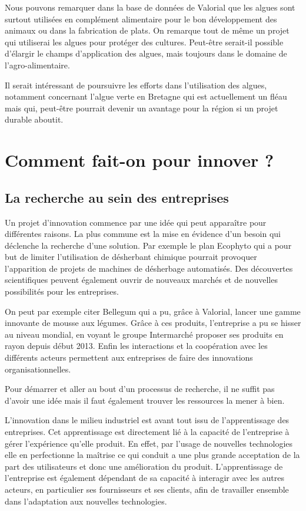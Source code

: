 \documentclass[a4paper,12pt]{report}
\begin{document}
			Nous pouvons remarquer dans la base de données de Valorial que les algues sont surtout utilisées en complément alimentaire pour le bon développement des animaux ou dans la fabrication de plats. On remarque tout de même un projet qui utiliserai les algues pour protéger des cultures. Peut-être serait-il possible d’élargir le champs d’application des algues, mais toujours dans le domaine de l’agro-alimentaire. 
			
			Il serait intéressant de poursuivre les efforts dans l’utilisation des algues, notamment concernant l’algue verte en Bretagne qui est actuellement un fléau mais qui, peut-être pourrait devenir un avantage pour la région si un projet durable aboutit. 
			
	\section{Comment fait-on pour innover ?}
			
		\subsection{La recherche au sein des entreprises}
			Un projet d’innovation commence par une idée qui peut apparaître pour différentes raisons. La plus commune est la mise en évidence d’un besoin qui déclenche la recherche d’une solution. Par exemple le plan Ecophyto\cite{RobotsChamps} qui a pour but de limiter l’utilisation de désherbant chimique pourrait provoquer l’apparition de projets de machines de désherbage automatisés. 
			Des découvertes scientifiques peuvent également ouvrir de nouveaux marchés et de nouvelles possibilités pour les entreprises. 
			
			On peut par exemple citer Bellegum\cite{Bellegum} qui a pu, grâce à Valorial, lancer une gamme innovante de mousse aux légumes. Grâce à ces produits, l’entreprise a pu se hisser au niveau mondial, en voyant le groupe Intermarché proposer ses produits en rayon depuis début 2013.
			Enfin les interactions et la coopération avec les différents acteurs permettent aux entreprises de faire des innovations organisationnelles.
			
			Pour démarrer et aller au bout d’un processus de recherche, il ne suffit pas d’avoir une idée mais il faut également trouver les ressources la mener à bien.
			
			L’innovation dans le milieu industriel est avant tout issu de l’apprentissage des entreprises. Cet apprentissage est directement lié à la capacité de l’entreprise à gérer l’expérience qu’elle produit. En effet, par l’usage de nouvelles technologies elle en perfectionne la maîtrise ce qui conduit a une plus grande acceptation de la part des utilisateurs et donc une amélioration du produit. 
			L’apprentissage de l’entreprise est également dépendant de sa capacité à interagir avec les autres acteurs, en particulier ses fournisseurs et ses clients, afin de travailler ensemble dans l’adaptation aux nouvelles technologies.
			
\end{document}
